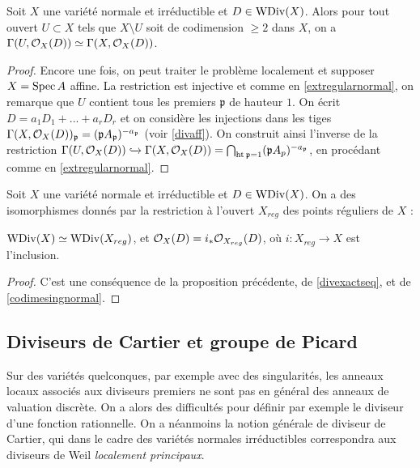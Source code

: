 \begin{prop}\label{isomorphismcodim2}
Soit $X$ une variété normale et irréductible et $D\in\operatorname{WDiv}(X)$. Alors pour tout ouvert $U\subset X$ tels que $X\setminus U$ soit de codimension $\geq 2$ dans $X$, on a $\Gamma(U,\mathcal{O}_X(D))\simeq \Gamma(X,\mathcal{O}_X(D))$.
\end{prop}
\begin{proof}
Encore une fois, on peut traiter le problème localement et supposer $X=\operatorname{Spec} A$ affine. La restriction est injective et comme en \ref{extregularnormal}, on remarque que $U$ contient tous les premiers $\mathfrak{p}$ de hauteur $1$. On écrit $D=a_1D_1+...+a_rD_r$ et on considère les injections dans les tiges $\Gamma(X,\mathcal{O}_X(D))_\mathfrak{p}=(\mathfrak{p}A_\mathfrak{p})^{-a_\mathfrak{p}}$ (voir \ref{divaff}). On construit ainsi l'inverse de la restriction $\Gamma(U, \mathcal{O}_X(D))\xhookrightarrow{}\Gamma(X,\mathcal{O}_X(D))=\bigcap_{\operatorname{ht}\mathfrak{p}=1}(\mathfrak{p}A_p)^{-a_\mathfrak{p}}$, en procédant comme en \ref{extregularnormal}.
\end{proof}

\begin{cor}\label{isomorphismcodim2CorXreg}
Soit $X$ une variété normale et irréductible et $D\in\operatorname{WDiv}(X)$. On a des isomorphismes donnés par la restriction à l'ouvert $X_{reg}$ des points réguliers de $X$ :
\begin{center}
$\operatorname{WDiv}(X)\simeq \operatorname{WDiv}(X_{reg})$, et  $\mathcal{O}_X(D)=i_*\mathcal{O}_{X_{reg}}(D)$, où $i:X_{reg}\rightarrow X$ est l'inclusion.
\end{center}
\end{cor}
\begin{proof}
C'est une conséquence de la proposition précédente, de \ref{divexactseq}, et de \ref{codimesingnormal}.
\end{proof}

\subsection{Diviseurs de Cartier et groupe de Picard}
\label{SectionDivCartierPicardGroup}
Sur des variétés quelconques, par exemple avec des singularités, les anneaux locaux associés aux diviseurs premiers ne sont pas en général des anneaux de valuation discrète. On a alors des difficultés pour définir par exemple le diviseur d'une fonction rationnelle. On a néanmoins la notion générale de diviseur de Cartier, qui dans le cadre des variétés normales irréductibles correspondra aux diviseurs de Weil \textit{localement principaux}.


